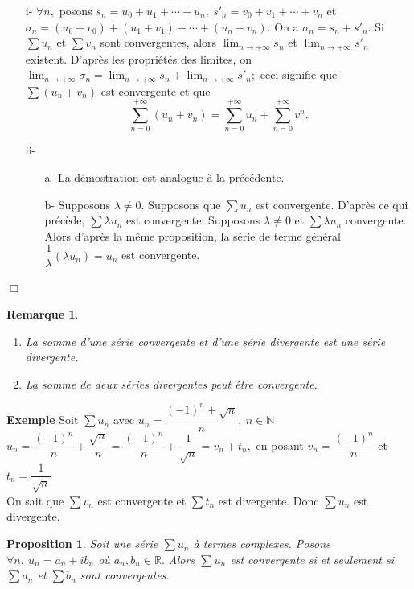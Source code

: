 \documentclass[11pt, a4paper]{book}
\newtheorem{pro}{Proposition}[section]
\newtheorem{rem}{Remarque}[section]
\newenvironment{pr}{\noindent {\bf Preuve} \noindent} {\hfill $\Box$\vskip 5mm}
\begin{document}
\begin{pr}\quad
\begin{enumerate}
\item[i-] $\forall n,$ posons $s_{n}=u_{0}+u_{1}+\cdots+u_{n},~s'_{n}=v_{0}+v_{1}+\cdots+v_{n}$ et $ \sigma_{n}=(u_{0}+v_{0})+(u_{1}+v_{1})+\cdots+(u_{n}+v_{n}).$ On a $ \sigma_{n}=s_{n}+s'_{n}.$ Si $\sum u_{n}$ et $\sum v_{n}$ sont convergentes, alors ${\displaystyle \lim_{n\rightarrow +\infty}s_{n}}$ et ${\displaystyle \lim_{n\rightarrow +\infty} s'_{n}}$ existent. D'apr\`es les propri\'et\'es des limites, on ${\displaystyle\lim_{n\rightarrow+\infty}\sigma_{n}=\lim_{n\rightarrow+\infty}s_{n}+\lim_{n\rightarrow+\infty}s'_{n}};$ ceci signifie que $\sum(u_{n}+v_{n})$ est convergente et que $$\sum_{n=0}^{+\infty} (u_{n}+v_{n})= \sum_{n=0}^{+\infty}u_{n}+\sum_{n=0}^{+\infty}v^{n}.$$
\item[ii-] \begin{enumerate}
\item[a-] La d\'emostration est analogue \`a la pr\'ec\'edente.
\item[b-] Supposons $ \lambda\neq0.$ Supposons que $\sum u_{n}$ est convergente. D'apr\`es ce qui pr\'ec\`ede, $\sum \lambda u_{n}$ est convergente. Supposons $ \lambda\neq0$ et $\sum \lambda u_{n}$ convergente. Alors d'apr\`es la m\^eme proposition, la s\'erie de terme g\'en\'eral $\dfrac{1}{\lambda}(\lambda u_{n})=u_{n}$ est convergente.
\end{enumerate}
\end{enumerate}
\end{pr} 
\begin{rem} \begin{enumerate}
\item La somme d'une s\'erie convergente et d'une s\'erie divergente est une s\'erie divergente.
\item La somme de deux s\'eries divergentes peut \^etre convergente.
\end{enumerate} \end{rem}
\textbf{Exemple}\quad
Soit $\sum u_{n}$ avec $u_{n}=\dfrac{(-1)^{n}+\sqrt{n}}{n},~ n \in \mathbb{N}$\\
$u_{n}=\dfrac{(-1)^{n}}{n}+\dfrac{\sqrt{n}}{n}=\dfrac{(-1)^{n}}{n}+\dfrac{1}{\sqrt{n}}=v_{n}+t_{n},$ en posant $v_{n}=\dfrac{(-1)^{n}}{n}$ et $t_n=\dfrac{1}{\sqrt{n}}$ \\
On sait que $\sum v_{n}$ est convergente et $\sum t_{n}$ est divergente. Donc $\sum u_{n}$ est divergente.
\begin{pro} \label{pro3.2} Soit une s\'erie $\sum u_{n}$ \`a termes complexes. Posons $\forall n,~u_{n}=a_{n}+ib_{n}$ o\`u $a_{n},b_{n}\in \mathbb{R}.$ Alors $\sum u_{n}$ est convergente si et seulement si $\sum a_{n}$ et $\sum b_{n}$ sont convergentes. \end{pro}
\end{document}

